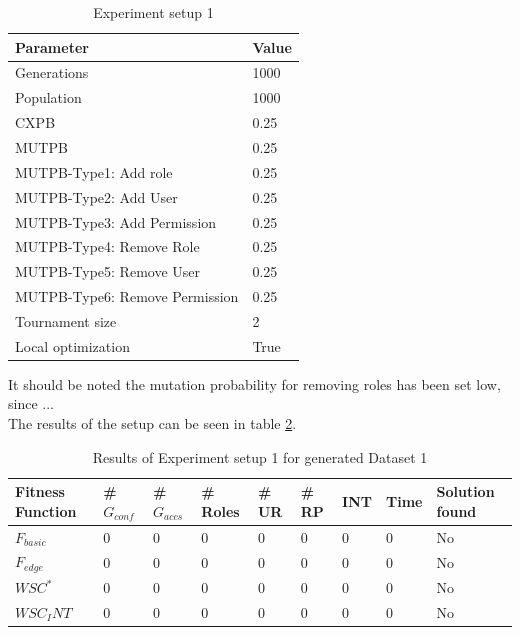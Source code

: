 \begin{table}
    \centering
    \begin{tabular}{|l|l|}
        \hline
        \rowcolor{myGray} 
        \textbf{Parameter}              & \textbf{Value}    \\ \hline
        Generations                     & 1000              \\ \hline
        Population                      & 1000              \\ \hline
        CXPB                            & 0.25              \\ \hline
        MUTPB                           & 0.25              \\ \hline
        MUTPB-Type1: Add role           & 0.25              \\ \hline
        MUTPB-Type2: Add User           & 0.25              \\ \hline
        MUTPB-Type3: Add Permission     & 0.25              \\ \hline
        MUTPB-Type4: Remove Role        & 0.25              \\ \hline
        MUTPB-Type5: Remove User        & 0.25              \\ \hline
        MUTPB-Type6: Remove Permission  & 0.25              \\ \hline
        Tournament size                 & 2                 \\ \hline
        Local optimization              & True              \\ \hline
    \end{tabular}
    \caption{Experiment setup 1}
    \label{tab:setup1}
\end{table}
It should be noted the mutation probability for removing roles has been set low, since ...\\
The results of the setup can be seen in table \ref{tab:results1}.
\begin{table}
    \centering
    \begin{tabular}{|l|l|l|l|l|l|l|l|l|}
        \hline
        \rowcolor{myGray} 
        \textbf{Fitness Function} & \textbf{\# $G_{conf}$} & \textbf{\# $G_{accs}$} & \textbf{\# Roles} & \textbf{\# UR} & \textbf{\# RP} & \textbf{INT} & \textbf{Time} & \textbf{Solution found}\\ \hline
        $F_{basic}$             &   0   &   0   &   0   &   0   &   0   &   0   &   0   & No\\ \hline
        $F_{edge}$              &   0   &   0   &   0   &   0   &   0   &   0   &   0   & No\\ \hline
        $WSC^*$                 &   0   &   0   &   0   &   0   &   0   &   0   &   0   & No\\ \hline
        $WSC_INT$               &   0   &   0   &   0   &   0   &   0   &   0   &   0   & No\\ \hline
    \end{tabular}
    \caption{Results of Experiment setup 1 for generated Dataset 1}
    \label{tab:results1}
\end{table}
